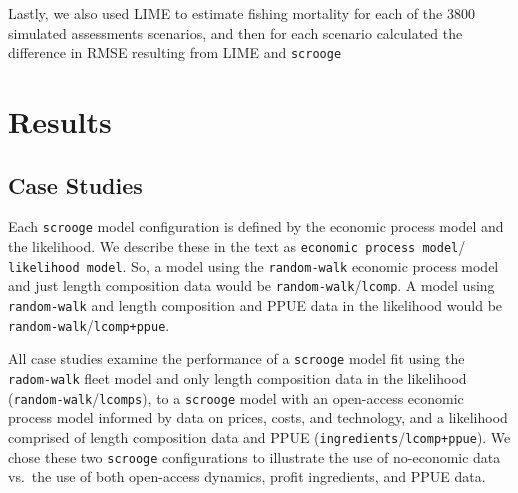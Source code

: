 \documentclass[twoside,12pt,final]{ucthesis-CA2012}
\begin{document}
\begin{ucmainmatter}
Lastly, we also used LIME to estimate fishing mortality for each of the
3800 simulated assessments scenarios, and then for each scenario
calculated the difference in RMSE resulting from LIME and
\texttt{scrooge}

\section{Results}\label{results-1}

\subsection{Case Studies}\label{case-studies}

Each \texttt{scrooge} model configuration is defined by the economic
process model and the likelihood. We describe these in the text as
\texttt{economic\ process\ model}/ \texttt{likelihood\ model}. So, a
model using the \texttt{random-walk} economic process model and just
length composition data would be \texttt{random-walk}/\texttt{lcomp}. A
model using \texttt{random-walk} and length composition and PPUE data in
the likelihood would be \texttt{random-walk}/\texttt{lcomp+ppue}.

All case studies examine the performance of a \texttt{scrooge} model fit
using the \texttt{radom-walk} fleet model and only length composition
data in the likelihood (\texttt{random-walk}/\texttt{lcomps}), to a
\texttt{scrooge} model with an open-access economic process model
informed by data on prices, costs, and technology, and a likelihood
comprised of length composition data and PPUE
(\texttt{ingredients}/\texttt{lcomp+ppue}). We chose these two
\texttt{scrooge} configurations to illustrate the use of no-economic
data vs.~the use of both open-access dynamics, profit ingredients, and
PPUE data.


\end{ucmainmatter}
\end{document}
